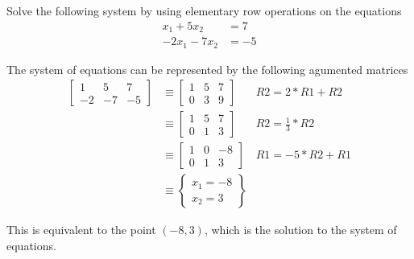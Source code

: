 \documentclass{mathhomework}
\begin{document}
\maketitle

\pagebreak

\begin{problem}[1.1\#1]
    Solve the following system by using elementary row operations on the equations
    \begin{align*}
        x_1 + 5x_2 &= 7 \\
        -2x_1 - 7x_2 &= -5
    \end{align*}

    \begin{solution}
        The system of equations can be represented by the following agumented matrices
        \begin{align*}
            \begin{bmatrix}
                1 & 5 & 7 \\
                -2 & -7 & -5
            \end{bmatrix}
            & \equiv
            \begin{bmatrix}
                1 & 5 & 7 \\
                0 & 3 & 9
            \end{bmatrix}
            & R2 = 2 * R1 + R2 \\ & \equiv
            \begin{bmatrix}
                1 & 5 & 7 \\
                0 & 1 & 3
            \end{bmatrix}
            & R2 = \frac{1}{3} * R2 \\ & \equiv
            \begin{bmatrix}
                1 & 0 & -8 \\
                0 & 1 & 3
            \end{bmatrix}
            & R1 = -5 * R2 + R1 \\ & \equiv
            \begin{Bmatrix}
                x_1 = -8 \\
                x_2 = 3
            \end{Bmatrix}
        \end{align*}

        This is equivalent to the point $(-8, 3)$, which is the solution to the system of equations.
    \end{solution}
\end{problem}
\end{document}
